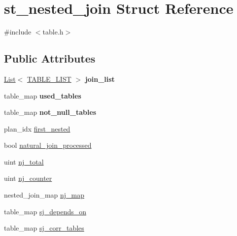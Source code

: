 \hypertarget{structst__nested__join}{}\section{st\+\_\+nested\+\_\+join Struct Reference}
\label{structst__nested__join}


{\ttfamily \#include $<$table.\+h$>$}

\subsection*{Public Attributes}
\begin{DoxyCompactItemize}
\item 
\mbox{\label{structst__nested__join_ab903d011d1523e33123b455b836ec49f}} 
\mbox{\hyperlink{classList}{List}}$<$ \mbox{\hyperlink{structTABLE__LIST}{T\+A\+B\+L\+E\+\_\+\+L\+I\+ST}} $>$ {\bfseries join\+\_\+list}
\item 
\mbox{\label{structst__nested__join_ac165423f70f4e0fbe820b16f0f7adb1b}} 
table\+\_\+map {\bfseries used\+\_\+tables}
\item 
\mbox{\label{structst__nested__join_a0bcdcd894533b9fd4b09b0edc2cc0fe4}} 
table\+\_\+map {\bfseries not\+\_\+null\+\_\+tables}
\item 
plan\+\_\+idx \mbox{\hyperlink{structst__nested__join_a7f32cd3a7b327aac61864a68095ed66f}{first\+\_\+nested}}
\item 
bool \mbox{\hyperlink{structst__nested__join_a5af07228b6a1ebf3b5bd2d7111783fab}{natural\+\_\+join\+\_\+processed}}
\item 
uint \mbox{\hyperlink{structst__nested__join_a9c35fa9ceadc335b3a9c06e498d4f8e5}{nj\+\_\+total}}
\item 
uint \mbox{\hyperlink{structst__nested__join_a361b5386d86e7de51ef7241de0de3fd3}{nj\+\_\+counter}}
\item 
nested\+\_\+join\+\_\+map \mbox{\hyperlink{structst__nested__join_a46f1da529bd60920ec39ab4082cade2e}{nj\+\_\+map}}
\item 
table\+\_\+map \mbox{\hyperlink{structst__nested__join_a9076f50ec461d7ff2340d77f89fac1e9}{sj\+\_\+depends\+\_\+on}}
\item 
table\+\_\+map \mbox{\hyperlink{structst__nested__join_ab4542c325c02396712de1f629fd621a9}{sj\+\_\+corr\+\_\+tables}}

\end{DoxyCompactItemize}
